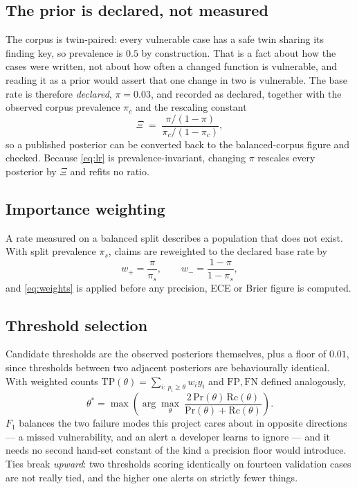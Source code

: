 \documentclass[conference]{IEEEtran}
\begin{document}
\subsection{The prior is declared, not measured}
The corpus is twin-paired: every vulnerable case has a safe twin sharing its finding key, so
prevalence is $0.5$ by construction. That is a fact about how the cases were written, not
about how often a changed function is vulnerable, and reading it as a prior would assert that
one change in two is vulnerable. The base rate is therefore \emph{declared}, $\pi = 0.03$, and
recorded as declared, together with the observed corpus prevalence $\pi_c$ and the rescaling
constant
\begin{equation}
\Xi \;=\; \frac{\pi/(1-\pi)}{\pi_c/(1-\pi_c)},
\end{equation}
so a published posterior can be converted back to the balanced-corpus figure and checked.
Because \eqref{eq:lr} is prevalence-invariant, changing $\pi$ rescales every posterior by
$\Xi$ and refits no ratio.

\subsection{Importance weighting}
A rate measured on a balanced split describes a population that does not exist. With split
prevalence $\pi_s$, claims are reweighted to the declared base rate by
\begin{equation}
w_{+} = \frac{\pi}{\pi_s}, \qquad w_{-} = \frac{1-\pi}{1-\pi_s},
\label{eq:weights}
\end{equation}
and \eqref{eq:weights} is applied before any precision, ECE or Brier figure is computed.

\subsection{Threshold selection}
Candidate thresholds are the observed posteriors themselves, plus a floor of $0.01$, since
thresholds between two adjacent posteriors are behaviourally identical. With weighted counts
$\mathrm{TP}(\theta)=\sum_{i:\,p_i \ge \theta} w_i y_i$ and $\mathrm{FP}, \mathrm{FN}$ defined
analogously,
\begin{equation}
\theta^{*} = \max\left( \arg\max_{\theta}\ \frac{2\,\mathrm{Pr}(\theta)\,\mathrm{Rc}(\theta)}{\mathrm{Pr}(\theta)+\mathrm{Rc}(\theta)} \right).
\label{eq:theta}
\end{equation}
$F_1$ balances the two failure modes this project cares about in opposite directions --- a
missed vulnerability, and an alert a developer learns to ignore --- and it needs no second
hand-set constant of the kind a precision floor would introduce. Ties break \emph{upward}: two
thresholds scoring identically on fourteen validation cases are not really tied, and the higher
one alerts on strictly fewer things.
\end{document}
